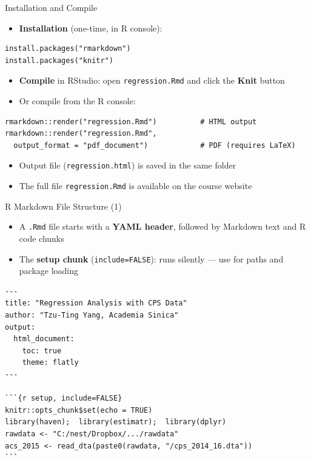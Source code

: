 \documentclass[dvipsnames,hyperref={pdfpagelabels=false}]{beamer}
\begin{document}
\begin{frame}[fragile]{Installation and Compile}

	\begin{itemize}
		\item \textbf{Installation} (one-time, in R console):
	\end{itemize}

\begin{lstlisting}
install.packages("rmarkdown")
install.packages("knitr")
\end{lstlisting}

	\begin{itemize}
		\item \textbf{Compile} in RStudio: open \texttt{regression.Rmd} and click the \textbf{Knit} button
		\vspace{0.2cm}
		\item Or compile from the R console:
	\end{itemize}

\begin{lstlisting}
rmarkdown::render("regression.Rmd")          # HTML output
rmarkdown::render("regression.Rmd",
  output_format = "pdf_document")            # PDF (requires LaTeX)
\end{lstlisting}

	\begin{itemize}
		\item Output file (\texttt{regression.html}) is saved in the same folder
		\vspace{0.2cm}
		\item The full file \texttt{regression.Rmd} is available on the course website
	\end{itemize}

\end{frame}



\begin{frame}[fragile]{R Markdown File Structure (1)}

	\begin{itemize}
		\item A \texttt{.Rmd} file starts with a \textbf{YAML header}, followed by Markdown text and R code chunks
		\vspace{0.2cm}
		\item The \textbf{setup chunk} (\texttt{include=FALSE}): runs silently --- use for paths and package loading
	\end{itemize}

\begin{lstlisting}[language={},basicstyle=\ttfamily\fontsize{7.5}{9}\selectfont,keywordstyle={}]
---
title: "Regression Analysis with CPS Data"
author: "Tzu-Ting Yang, Academia Sinica"
output:
  html_document:
    toc: true
    theme: flatly
---

```{r setup, include=FALSE}
knitr::opts_chunk$set(echo = TRUE)
library(haven);  library(estimatr);  library(dplyr)
rawdata <- "C:/nest/Dropbox/.../rawdata"
acs_2015 <- read_dta(paste0(rawdata, "/cps_2014_16.dta"))
```
\end{lstlisting}

\end{frame}
\end{document}

